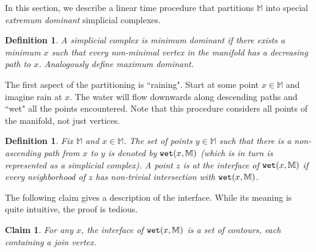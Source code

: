 \documentclass[11pt]{article}
\newtheorem{claim}[theorem]{Claim}
\newtheorem{definition}[theorem]{Definition}
\theoremstyle{definition}
\newcommand{\MM}{\mathbb{M}}
\newcommand{\wet}{{\tt wet}}
\begin{document}
In this section, we describe a linear time procedure that partitions $\MM$ into special
\emph{extremum dominant} simplicial complexes.

\begin{definition} \label{def:dom} A simplicial complex is \emph{minimum dominant} if there exists
a minimum $x$ such that every non-minimal \emph{vertex} in the manifold has a decreasing path to $x$.
Analogously define \emph{maximum dominant}. 
\end{definition}

The first aspect of the partitioning is ``raining". Start at some point $x \in \MM$ and imagine rain at $x$.
The water will flow downwards along descending paths and ``wet" all the points encountered. Note that this procedure considers all points
of the manifold, not just vertices.

\begin{definition} \label{def:wet} Fix $\MM$ and $x \in \MM$. The set of points $y \in \MM$ such that there is a non-ascending path from $x$ to $y$
is denoted by $\wet(x,\MM)$ (which is in turn is represented as a simplicial complex). A point $z$ is at the \emph{interface} of $\wet(x,\MM)$ if every neighborhood of $z$
has non-trivial intersection with $\wet(x,\MM)$.
\end{definition}

The following claim gives a description of the interface. While its meaning is quite intuitive, the proof is tedious.

\begin{claim} \label{clm:inter} For any $x$, the interface of $\wet(x,\MM)$ is a set of contours,
each containing a join vertex.
\end{claim}
\end{document}
